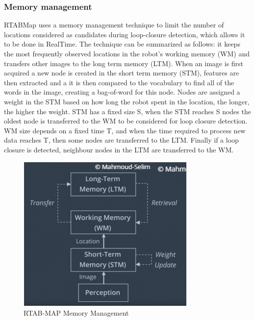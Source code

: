 \documentclass[10pt,journal,compsoc]{IEEEtran}
\begin{document}
\subsubsection{Memory management}
RTABMap uses a memory management technique to limit
the number of locations considered as candidates during
loop-closure detection, which allows it to be done in RealTime. The technique can be summarized as follows: it
keeps the most frequently observed locations in the robot’s
working memory (WM) and transfers other images to the
long term memory (LTM). When an image is first acquired
a new node is created in the short term memory (STM),
features are then extracted and a it is then compared to the
vocabulary to find all of the words in the image, creating
a bag-of-word for this node. Nodes are assigned a weight
in the STM based on how long the robot spent in the location, the longer, the higher the weight. STM has a fixed
size S, when the STM reaches S nodes the oldest node is
transferred to the WM to be considered for loop closure
detection. WM size depends on a fixed time T, and when
the time required to process new data reaches T, then some
nodes are transferred to the LTM. Finally if a loop closure is
detected, neighbour nodes in the LTM are transferred to the
WM.
\begin{figure}[thpb]
      \centering
      \includegraphics[width=\linewidth]{memory_management}
      \caption{ RTAB-MAP Memory Management}
      \label{fig:rtab_mem_mgmt}
\end{figure}
\end{document}
